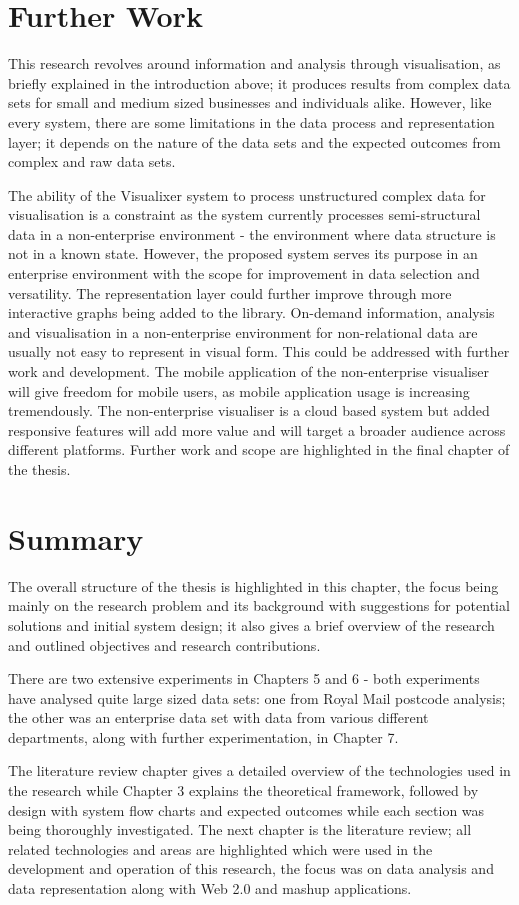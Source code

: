 \section{Further Work}

This research revolves around information and analysis through visualisation, as briefly explained in the introduction above; it produces results from complex data sets for small and medium sized businesses and individuals alike. However, like every system, there are some limitations in the data process and representation layer;  it depends on the nature of the data sets and the expected outcomes from complex and raw data sets.

The ability of the Visualixer system to process unstructured complex data for visualisation is a constraint as the system currently processes semi-structural data in a non-enterprise environment - the environment where data structure is not in a known state. However, the proposed system serves its purpose in an enterprise environment with the scope for improvement in data selection and versatility. The representation layer could further improve through more interactive graphs being added to the library. On-demand information, analysis and visualisation in a non-enterprise environment for non-relational data are usually not easy to represent in visual form. This could be addressed with further work and development. The mobile application of the non-enterprise visualiser will give freedom for mobile users, as mobile application usage is increasing tremendously. The non-enterprise visualiser is a cloud based system but added responsive features will add more value and will target a broader audience across different platforms. Further work and scope are highlighted in the final chapter of the thesis.

\section{Summary}

The overall structure of the thesis is highlighted in this chapter, the focus being mainly on the research problem and its background with suggestions for potential solutions and initial system design; it also gives a brief overview of the research and outlined objectives and research contributions.

There are two extensive experiments in Chapters 5 and 6 - both experiments have analysed quite large sized data sets: one from Royal Mail postcode analysis; the other was an enterprise data set with data from various different departments, along with further experimentation, in Chapter 7.

The literature review chapter gives a detailed overview of the technologies used in the research while Chapter 3 explains the theoretical framework, followed by design with system flow charts and expected outcomes while each section was being thoroughly investigated. The next chapter is the literature review; all related technologies and areas are highlighted which were used in the development and operation of this research, the focus was on data analysis and data representation along with Web 2.0 and mashup applications.




